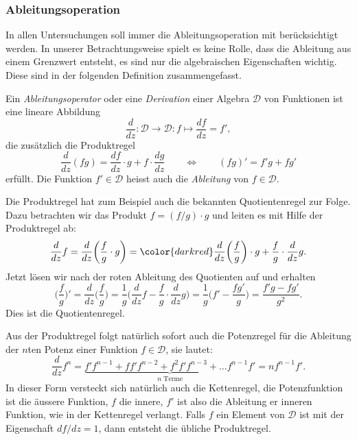 \subsubsection{Ableitungsoperation}
In allen Untersuchungen soll immer die Ableitungsoperation
mit berücksichtigt werden.
In unserer Betrachtungsweise spielt es keine Rolle, dass die
Ableitung aus einem Grenzwert entsteht, es sind nur die algebraischen
Eigenschaften wichtig.
Diese sind in der folgenden Definition zusammengefasst.

\begin{definition}
\label{buch:integrale:def:derivation}
Ein {\em Ableitungsoperator} oder eine {\em Derivation} einer Algebra
$\mathscr{D}$ von Funktionen ist eine lineare Abbildung
\[
\frac{d}{dz}
\colon \mathscr{D} \to \mathscr{D}
:
f \mapsto \frac{df}{dz} = f',
\]
die zusätzlich die Produktregel
\begin{equation}
\frac{d}{dz} (fg)
=
\frac{df}{dz} \cdot g + f \cdot \frac{dg}{dz}
\qquad\Leftrightarrow\qquad
(fg)' = f' g + fg'
\label{buch:integrale:eqn:produktregel}
\end{equation}
%
erfüllt.
Die Funktion $f'\in \mathscr{D}$ heisst auch die {\em Ableitung}
von $f\in\mathscr{D}$.
%
%
%
\end{definition}

Die Produktregel hat zum Beispiel auch die bekannten Quotientenregel
zur Folge.
Dazu betrachten wir das Produkt $f= (f/g)\cdot g$ und leiten es mit
Hilfe der Produktregel ab:
\[
\frac{d}{dz}f
=
\frac{d}{dz}
\biggl(
\frac{f}{g}\cdot g
\biggr)
=
{\color{darkred}
\frac{d}{dz}
\biggl(
\frac{f}{g}
\biggr)}
\cdot g
+
\frac{f}{g}\cdot \frac{d}{dz}g.
\]
Jetzt lösen wir nach der {\color{darkred}roten} Ableitung des Quotienten
auf und erhalten
\begin{equation}
\biggl(\frac{f}{g}\biggr)'
=
\frac{d}{dz}\biggl(\frac{f}{g}\biggr)
=
\frac1g\biggl(
\frac{d}{dz}f - \frac{f}{g}\cdot \frac{d}{dz}g
\biggr)
=
\frac{1}{g}
\biggl(
f'-\frac{fg'}{g}
\biggr)
=
\frac{f'g-fg'}{g^2}.
\label{buch:integrale:eqn:quotientenregel}
\end{equation}
Dies ist die Quotientenregel.

Aus der Produktregel folgt natürlich sofort auch die Potenzregel
für die Ableitung der $n$ten Potenz einer Funktion $f\in\mathscr{D}$, 
sie lautet:
\begin{equation}
\frac{d}{dz} f^n
= 
\underbrace{
f'f^{n-1} + ff'f^{n-2} + f^2f'f^{n-3}+\dots f^{n-1}f'
}_{\displaystyle \text{$n$ Terme}}
=
nf^{n-1}f'.
\label{buch:integrale:eqn:potenzregel}
\end{equation}
In dieser Form versteckt sich natürlich auch die Kettenregel, die
Potenzfunktion ist die äussere Funktion, $f$ die innere, $f'$ ist also
die Ableitung er inneren Funktion, wie in der Kettenregel verlangt.
Falls $f$ ein Element von $\mathscr{D}$ ist mit der Eigenschaft
$df/dz=1$, dann entsteht die übliche Produktregel.

